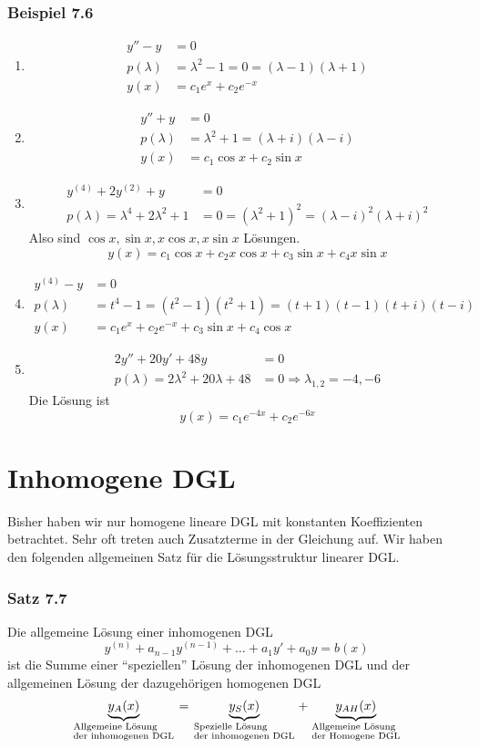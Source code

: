 \subsubsection*{Beispiel 7.6}
\begin{enumerate}
\item \begin{align*}
y''-y&=0\\
p(\lambda)&=\lambda^2-1=0=(\lambda-1)(\lambda+1)\\
y(x)&=c_1e^x+c_2e^{-x}
\end{align*}
\item 
\begin{align*}
y''+y&=0\\
p(\lambda)&=\lambda^2+1=(\lambda+i)(\lambda-i)\\
y(x)&=c_1\cos x+c_2\sin x
\end{align*}
\item 
\begin{align*}
y^{(4)}+2y^{(2)}+y&=0\\
p(\lambda)=\lambda^4+2\lambda^2+1&=0=(\lambda^2+1)^2=(\lambda-i)^2(\lambda+i)^2
\end{align*}
Also sind $\cos x, \sin x, x\cos x,x\sin x$ Lösungen. \[y(x)=c_1\cos x+c_2 x\cos x+c_3\sin x+c_4 x\sin x\]
\item \begin{align*}
y^{(4)}-y&=0\\
p(\lambda)&=t^4-1=(t^2-1)(t^2+1)=(t+1)(t-1)(t+i)(t-i)\\
y(x)&=c_1e^x+c_2e^{-x}+c_3\sin x+c_4\cos x
\end{align*}
\item \begin{align*}
2y''+20y'+48y&=0\\
p(\lambda)=2\lambda^2 +20\lambda+48&=0\Rightarrow \lambda_{1,2}=-4,-6
\end{align*}
Die Lösung ist \[y(x)=c_1e^{-4x}+c_2e^{-6x}\]
\end{enumerate}
\section{Inhomogene DGL}
Bisher haben wir nur homogene lineare DGL mit konstanten Koeffizienten betrachtet. Sehr oft treten auch Zusatzterme in der Gleichung auf. Wir haben den folgenden allgemeinen Satz für die Lösungsstruktur linearer DGL.
\subsubsection*{Satz 7.7}
Die allgemeine Lösung einer inhomogenen DGL \[y^{(n)}+a_{n-1}y^{(n-1)}+\dots +a_1y'+a_0y=b(x)\] ist die Summe einer ``speziellen'' Lösung der inhomogenen DGL und der allgemeinen Lösung der dazugehörigen homogenen DGL $$\underbrace {{y_A}(x)}_{\scriptstyle{\text{Allgemeine Lösung }}\hfill\atop
\scriptstyle{\text{der inhomogenen DGL}}\hfill} = \underbrace {{y_S}(x)}_{\scriptstyle{\text{Spezielle Lösung }}\hfill\atop
\scriptstyle{\text{der inhomogenen DGL}}\hfill} + \underbrace {{y_{AH}}(x)}_{\scriptstyle{\text{Allgemeine Lösung }}\hfill\atop
\scriptstyle{\text{der Homogene DGL}}\hfill}$$

